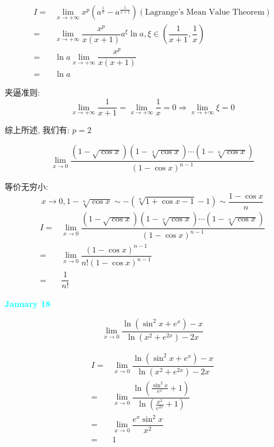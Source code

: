 \begin{solution}

	\begin{align*}
		I = & \lim\limits_{x\to +\infty}x^{p}(a^{\frac{1}{x}}-a^{\frac{1}{x+1}})(\text{Lagrange's Mean Value Theorem})\\
		  = & \lim\limits_{x\to +\infty}\dfrac{x^{p}}{x(x+1)}a^{\xi}\ln a, \xi\in(\dfrac{1}{x+1},\dfrac{1}{x})\\
		  = & \ln a\lim\limits_{x\to +\infty}\dfrac{x^{p}}{x(x+1)}\\
		  = & \ln a
	\end{align*}

	夹逼准则: 
	$$\lim\limits_{x\to +\infty} \dfrac{1}{x+1} =\lim\limits_{x\to +\infty} \dfrac{1}{x} = 0\Rightarrow \lim\limits_{x\to +\infty} \xi =0$$

	综上所述, 我们有: $p = 2$
\end{solution}

\begin{example}[][Exam: 27.3.6]
	$$\lim\limits_{x\to 0}\dfrac{(1-\sqrt{\cos x})(1-\sqrt[3]{\cos x})\cdots(1-\sqrt[n]{\cos x})}{(1-\cos x)^{n-1}}$$
\end{example}

\begin{solution}
	
	等价无穷小: 
	$$x\to 0, 1- \sqrt[n]{\cos x}\sim -(\sqrt[n]{1+\cos x-1}-1)\sim \dfrac{1-\cos x}{n}$$
	\begin{align*}
		I = & \lim\limits_{x\to 0}\dfrac{(1-\sqrt{\cos x})(1-\sqrt[3]{\cos x})\cdots(1-\sqrt[n]{\cos x})}{(1-\cos x)^{n-1}}\\
		  = & \lim\limits_{x\to 0}\dfrac{(1-\cos x)^{n-1}}{n!(1-\cos x)^{n-1}}\\
		  = & \dfrac{1}{n!}
	\end{align*}
\end{solution}

\textcolor{cyan}{\textbf{January 18}}

\begin{example}[][Exam: 27.3.7]
	$$\lim\limits_{x\to 0}\dfrac{\ln(\sin^{2}x+e^{x})-x}{\ln(x^{2}+e^{2x})-2x}$$
\end{example}

\begin{solution}

	\begin{align*}
		I = & \lim\limits_{x\to 0}\dfrac{\ln(\sin^{2}x+e^{x})-x}{\ln(x^{2}+e^{2x})-2x}\\
		  = & \lim\limits_{x\to 0}\dfrac{\ln(\frac{\sin^{2}x}{e^{x}}+1)}{\ln(\frac{x^{2}}{e^{2x}}+1)}\\
		  = & \lim\limits_{x\to 0}\dfrac{e^{x}\sin^{2}x}{x^{2}}\\
		  = & 1
	\end{align*}
\end{solution}


